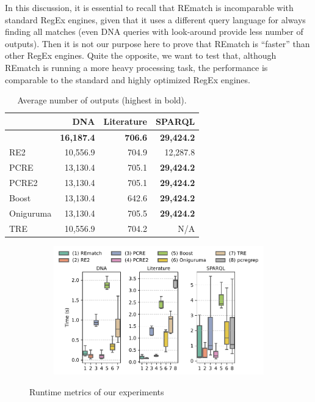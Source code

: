 In this discussion, it is essential to recall that REmatch is incomparable with
standard RegEx engines, given that it uses a different query language for always
finding all matches (even DNA queries with look-around provide less number of
outputs). Then it is not our purpose here to prove that REmatch is ``faster''
than other RegEx engines. Quite the opposite, we want to test that, although
REmatch is running a more heavy processing task, the performance is comparable
to the standard and highly optimized RegEx engines.

\begin{table}
	\begin{tabular}{l|rrr}
		                   & \textsf{DNA}      & \textsf{Literature} &
		                   \textsf{SPARQL}   \\
		\hline
		\rematch           & \textbf{16,187.4} & \textbf{706.6}      &
		\textbf{29,424.2} \\
		\textsf{RE2}       & 10,556.9          & 704.9               & 12,287.8
		\\
		\textsf{PCRE}      & 13,130.4          & 705.1               &
		\textbf{29,424.2} \\
		\textsf{PCRE2}     & 13,130.4          & 705.1               &
		\textbf{29,424.2} \\
		\textsf{Boost}     & 13,130.4          & 642.6               &
		\textbf{29,424.2} \\
		\textsf{Oniguruma} & 13,130.4          & 705.5               &
		\textbf{29,424.2} \\
		\textsf{TRE}       & 10,556.9          & 704.2               & N/A
	\end{tabular}
	\caption{Average number of outputs (highest in bold).}
	\label{tab:outputs}
\end{table}

\begin{figure}[t]
	\centering
	\begin{subfigure}[b]{.8\textwidth}
		\centering
		\includegraphics[width=\textwidth]{figures/lookahead-time.pdf}
	\end{subfigure}
	\caption{Runtime metrics of our experiments}
	\label{fig:comparison}
\end{figure}



